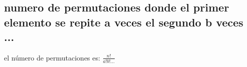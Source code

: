 \subsection{numero de permutaciones donde el primer elemento se repite a veces el segundo b veces ...}
el número de permutaciones es:
$\frac{n!}{a!b!...}$
